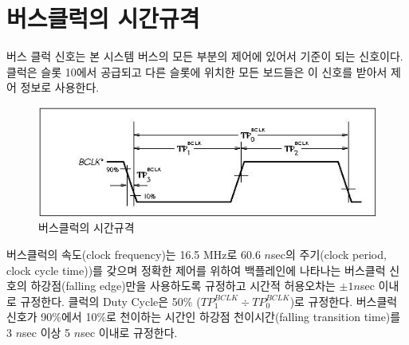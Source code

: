 \section{버스클럭의 시간규격}
%
버스 클럭 신호는 본 시스템 버스의 모든 부분의 제어에 있어서 기준이 되는 신호이다.
클럭은 슬롯 10에서 공급되고 다른 슬롯에 위치한 모든 보드들은 이 신호를 받아서 제어 정보로 사용한다.
%

\begin{figure}[htb]
    \centerline{\includegraphics{ch6/FIG/bclk-time.jpg}}
   \caption{버스클럭의 시간규격}\label{figure:bclk-time}
\end{figure}
%

버스클럭의 속도(clock frequency)는 16.5 MHz로
60.6 $n$sec의 주기(clock period, clock cycle time))를
갖으며 정확한 제어를 위하여 
백플레인에 나타나는 버스클럭 신호의 하강점(falling edge)만을
사용하도록 규정하고 시간적 허용오차는 $\pm1 n$sec 이내로 규정한다.
클럭의 Duty Cycle은 50\% ($TP^{BCLK}_1 \div TP^{BCLK}_0$)로 규정한다.
버스클럭 신호가 90\%에서 10\%로 
천이하는 시간인 하강점 천이시간(falling transition time)를
3 $n$sec 이상 5 $n$sec 이내로 규정한다.
